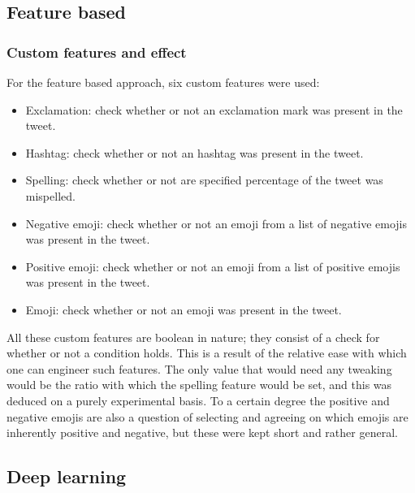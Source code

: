 \subsection{Feature based}
\subsubsection{Custom features and effect}
For the feature based approach, six custom features were used:
\begin{itemize}
\item Exclamation: check whether or not an exclamation mark was present in the tweet.
\item Hashtag: check whether or not an hashtag was present in the tweet.
\item Spelling: check whether or not are specified percentage of the tweet was mispelled.
\item Negative emoji: check whether or not an emoji from a list of negative emojis was present in the tweet.
\item Positive emoji: check whether or not an emoji from a list of positive emojis was present in the tweet.
\item Emoji: check whether or not an emoji was present in the tweet.
\end{itemize}
All these custom features are boolean in nature; they consist of a check for whether or not a condition holds. This is a result of the relative ease with which one can engineer such features. The only value that would need any tweaking would be the ratio with which the spelling feature would be set, and this was deduced on a purely experimental basis. To a certain degree the positive and negative emojis are also a question of selecting and agreeing on which emojis are inherently positive and negative, but these were kept short and rather general.

\subsection{Deep learning}
